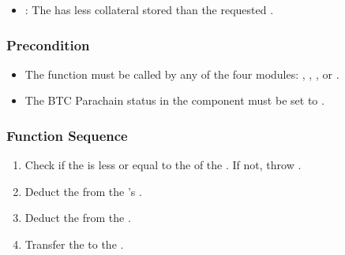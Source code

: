 \documentclass[a4paper,10pt,english]{sphinxmanual}
\begin{document}
\begin{itemize}
\item {} 
: The  has less collateral stored than the requested .

\end{itemize}


\subsubsection{Precondition}
\label{\detokenize{spec/collateral:id4}}\begin{itemize}
\item {} 
The function must be called by any of the four modules: {\hyperref[\detokenize{spec/issue:issue-protocol}]{}}, {\hyperref[\detokenize{spec/redeem:redeem-protocol}]{}}, {\hyperref[\detokenize{spec/replace:replace-protocol}]{}}, or {\hyperref[\detokenize{spec/vault-registry:vault-registry}]{}}.

\item {} 
The BTC Parachain status in the {\hyperref[\detokenize{spec/security:security}]{}} component must be set to .

\end{itemize}


\subsubsection{Function Sequence}
\label{\detokenize{spec/collateral:id5}}\begin{enumerate}
%
\item {} 
Check if the  is less or equal to the  of the . If not, throw .

\item {} 
Deduct the  from the ’s .

\item {} 
Deduct the  from the .

\item {} 
Transfer the  to the .

\end{enumerate}
\end{document}
